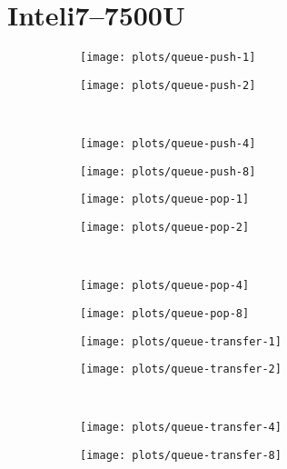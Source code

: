 \documentclass[b5paper]{report}
\begin{document}
\section{Intel\textregistered{}i7--7500U}
\begin{figure}
  \begin{subfigure}{0.45\textwidth}
    \texttt{[image: plots/queue-push-1]}
  \end{subfigure}
  \begin{subfigure}{0.45\textwidth}
    \texttt{[image: plots/queue-push-2]}
  \end{subfigure}
  \\
  \begin{subfigure}{0.45\textwidth}
    \texttt{[image: plots/queue-push-4]}
  \end{subfigure}
  \begin{subfigure}{0.45\textwidth}
    \texttt{[image: plots/queue-push-8]}
  \end{subfigure}
  \caption{}
\end{figure}

\begin{figure}
  \begin{subfigure}{0.45\textwidth}
    \texttt{[image: plots/queue-pop-1]}
  \end{subfigure}
  \begin{subfigure}{0.45\textwidth}
    \texttt{[image: plots/queue-pop-2]}
  \end{subfigure}
  \\
  \begin{subfigure}{0.45\textwidth}
    \texttt{[image: plots/queue-pop-4]}
  \end{subfigure}
  \begin{subfigure}{0.45\textwidth}
    \texttt{[image: plots/queue-pop-8]}
  \end{subfigure}
\end{figure}

\begin{figure}
  \begin{subfigure}{0.45\textwidth}
    \texttt{[image: plots/queue-transfer-1]}
  \end{subfigure}
  \begin{subfigure}{0.45\textwidth}
    \texttt{[image: plots/queue-transfer-2]}
  \end{subfigure}
  \\
  \begin{subfigure}{0.45\textwidth}
    \texttt{[image: plots/queue-transfer-4]}
  \end{subfigure}
  \begin{subfigure}{0.45\textwidth}
    \texttt{[image: plots/queue-transfer-8]}
  \end{subfigure}
\end{figure}
\end{document}
